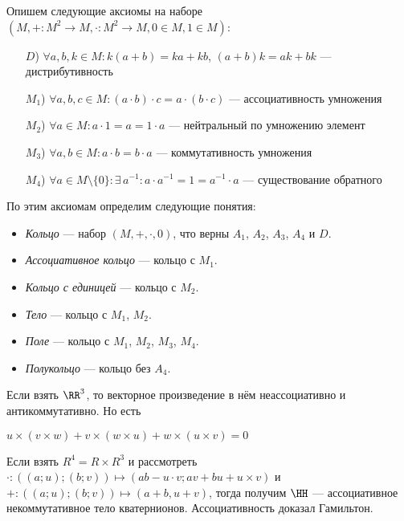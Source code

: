 \documentclass[12pt,a4paper]{article}
\begin{document}
    \begin{definition} Опишем следующие аксиомы на наборе $(M, +: M^2 \to M, \cdot: M^2 \to M, 0 \in M, 1 \in M)$:
        \begin{itemize}
            \item[$D$)] $\forall a, b, k \in M: k(a + b) = ka + kb$, $(a + b)k = ak + bk$ --- дистрибутивность
            \item[$M_1$)] $\forall a, b, c \in M: (a \cdot b) \cdot c = a \cdot (b \cdot c)$ --- ассоциативность умножения
            \item[$M_2$)] $\forall a \in M: a \cdot 1 = a = 1 \cdot a$ --- нейтральный по умножению элемент
            \item[$M_3$)] $\forall a, b \in M: a \cdot b = b \cdot a$ --- коммутативность умножения
            \item[$M_4$)] $\forall a \in M \setminus \{0\}: \exists\, a^{-1}: a \cdot a^{-1} = 1 = a^{-1} \cdot a$ --- существование обратного
        \end{itemize}
        По этим аксиомам определим следующие понятия:
        \begin{itemize}
            \item \emph{Кольцо} --- набор $(M, +, \cdot, 0)$, что верны $A_1$, $A_2$, $A_3$, $A_4$ и $D$.
            \item \emph{Ассоциативное кольцо} --- кольцо с $M_1$.
            \item \emph{Кольцо с единицей} --- кольцо с $M_2$.
            \item \emph{Тело} --- кольцо с $M_1$, $M_2$.
            \item \emph{Поле} --- кольцо с $M_1$, $M_2$, $M_3$, $M_4$.
            \item \emph{Полукольцо} --- кольцо без $A_4$.
        \end{itemize}
    \end{definition}

    \begin{example}
        Если взять $\RR^3$, то векторное произведение в нём неассоциативно и антикоммутативно. Но есть
        \begin{lemma*}
            $u\times (v\times w) + v\times (w\times u) + w\times (u\times v) = 0$
        \end{lemma*}
    \end{example}

    \begin{example}
        Если взять $R^4 = R \times R^3$ и рассмотреть $\cdot: ((a; u); (b; v)) \mapsto (ab-u\cdot v; av + bu + u\times v)$ и $+: ((a; u); (b; v)) \mapsto (a + b, u + v)$, тогда получим $\HH$ --- ассоциативное некоммутативное тело кватернионов. Ассоциативность доказал Гамильтон.
    \end{example}
\end{document}
